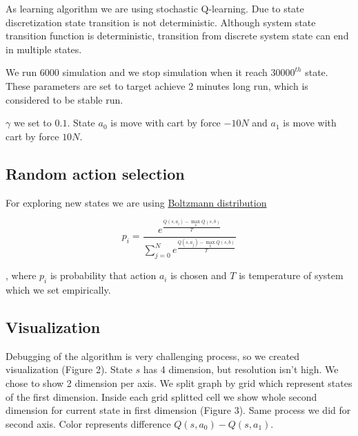 \documentclass[12pt,a4paper]{article}
\begin{document}
As learning algorithm we are using stochastic Q-learning. Due to state discretization state transition is not deterministic. Although system state transition function is deterministic, transition from discrete system state can end in multiple states. 


We run 6000 simulation and we stop simulation when it reach $30000^{th}$ state. These parameters are set to target achieve 2 minutes long run, which is considered to be stable run.

$\gamma$ we set to $0.1$. State $a_0$ is move with cart by force $-10N$ and $a_1$ is move with cart by force $10N$.

\subsection{Random action selection}

For exploring new states we are using \href{distriburion https://en.wikipedia.org/wiki/Boltzmann\_distribution}{Boltzmann distribution}

$$
p_i = \frac{e^{\frac{Q(s,a_i) - \max_{b}Q(s,b)}{T}}}
                        {\sum\limits_{j=0}^N e^{\frac{Q(s,a_j) - \max_{b}Q(s,b)}{T}}}
$$

\noindent
, where $p_i$ is probability that action $a_i$ is chosen and $T$ is temperature of system which we set empirically.


\subsection{Visualization}

Debugging of the algorithm is very challenging process, so we created visualization (Figure 2). State $s$ has 4 dimension, but resolution isn't high. We chose to show 2 dimension per axis. We split graph by grid which represent states of the first dimension. Inside each grid splitted cell we show whole second dimension for current state in first dimension (Figure 3). Same process we did for second axis. Color represents difference $Q(s, a_0) - Q(s, a_1)$.
\end{document}
